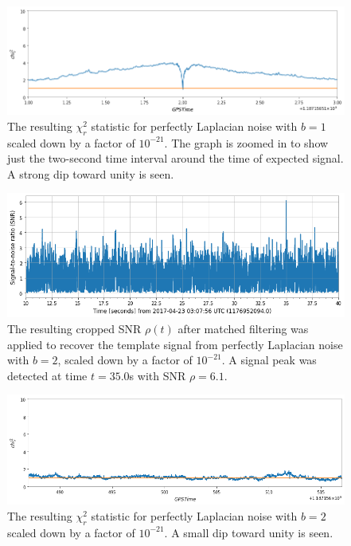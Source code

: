 \documentclass[preprint,
letterpaper,
 amsmath,amssymb,
 aps,
]{revtex4-2}
\begin{document}
\begin{widetext}

\begin{figure}[t]
\includegraphics[width = .9\textwidth]{chi2 laplace b=1.png}
\caption{The resulting $\chi^2_r$ statistic for perfectly Laplacian noise with $b=1$ scaled down by a factor of $10^{-21}$. The graph is zoomed in to show just the two-second time interval around the time of expected signal. A strong dip toward unity is seen.}
\centering
\end{figure} 


\begin{figure}[t]
\includegraphics[width = .9\textwidth]{laplacian b=2 template 1.png}
\caption{The resulting cropped SNR $\rho(t)$ after matched filtering was applied to recover the template signal from perfectly Laplacian noise with $b=2$, scaled down by a factor of $10^{-21}$. A signal peak was detected at time $t = 35.0$s with SNR $\rho = 6.1$.}
\centering
\end{figure} 

\begin{figure}[t]
\includegraphics[width = .9\textwidth]{chi2 laplace b=2 zoomed.png}
\caption{The resulting $\chi^2_r$ statistic for perfectly Laplacian noise with $b=2$ scaled down by a factor of $10^{-21}$. A small dip toward unity is seen.}
\centering
\end{figure} 
\end{widetext}
\end{document}
